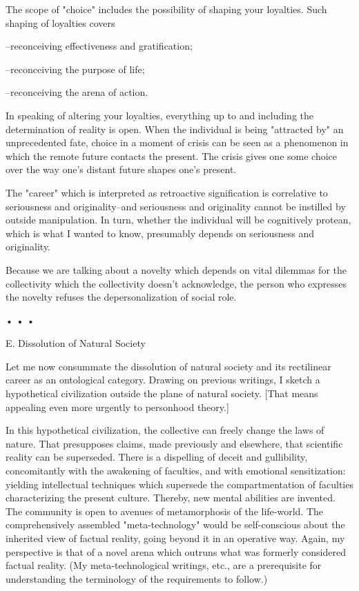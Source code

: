 \begin{enumerate}[label=\alph*.]
The scope of "choice" includes the possibility of shaping your loyalties. Such shaping of loyalties covers

–reconceiving effectiveness and gratification;

–reconceiving the purpose of life;

–reconceiving the arena of action.

In speaking of altering your loyalties, everything up to and including the determination of reality is open. When the individual is being "attracted by" an unprecedented fate, choice in a moment of crisis can be seen as a phenomenon in which the remote future contacts the present. The crisis gives one some choice over the way one's distant future shapes one's present.

The "career" which is interpreted as retroactive signification is correlative to seriousness and originality–and seriousness and originality cannot be instilled by outside manipulation. In turn, whether the individual will be cognitively protean, which is what I wanted to know, presumably depends on seriousness and originality.

Because we are talking about a novelty which depends on vital dilemmas for the collectivity which the collectivity doesn't acknowledge, the person who expresses the novelty refuses the depersonalization of social role.

• • •

E. Dissolution of Natural Society

Let me now consummate the dissolution of natural society and its rectilinear career as an ontological category. Drawing on previous writings, I sketch a hypothetical civilization outside the plane of natural society. [That means appealing even more urgently to personhood theory.]

In this hypothetical civilization, the collective can freely change the laws of nature. That presupposes claims, made previously and elsewhere, that scientific reality can be superseded. There is a dispelling of deceit and gullibility, concomitantly with the awakening of faculties, and with emotional sensitization: yielding intellectual techniques which supersede the compartmentation of faculties characterizing the present culture. Thereby, new mental abilities are invented. The community is open to avenues of metamorphosis of the life-world. The comprehensively assembled "meta-technology" would be self-conscious about the inherited view of factual reality, going beyond it in an operative way. Again, my perspective is that of a novel arena which outruns what was formerly considered factual reality. (My meta-technological writings, etc., are a prerequisite for understanding the terminology of the requirements to follow.)


\end{enumerate}
